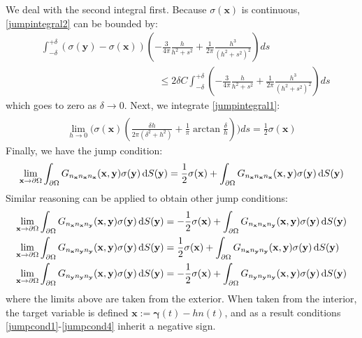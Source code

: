 \documentclass[preprint,12pt,3p]{elsarticle}
\newcommand{\dd}{ {\rm d} }
\begin{document}
We deal with the second integral first. Because $\sigma(\mathbf{x})$ is continuous, \eqref{jumpintegral2} can be bounded by:
\begin{align}
    &\int^{+\delta}_{-\delta} (\sigma(\mathbf{y}) - \sigma(\mathbf{x}))  \left(  - \frac{3}{4 \pi} \frac{h}{h^2 + s^2} + \frac{1}{2\pi} \frac{h^3}{(h^2 + s^2)^2} \right)  ds \nonumber \\
    &\qquad\qquad\qquad\qquad\qquad\qquad \leq 2 \delta C \int^{+\delta}_{-\delta}   \left(  - \frac{3}{4 \pi} \frac{h}{h^2 + s^2} + \frac{1}{2\pi} \frac{h^3}{(h^2 + s^2)^2} \right)  ds
\end{align}
which goes to zero as $\delta \xrightarrow[]{} 0$. Next, we integrate \eqref{jumpintegral1}:
\begin{align}
    \lim_{h \xrightarrow{} 0} \bigg( \sigma(\mathbf{x}) \left( \frac{\delta h}{2\pi(\delta^2 + h^2)}  + \frac{1}{\pi} \arctan \frac{\delta}{h} \right) \bigg) ds = \frac{1}{2} \sigma(\mathbf{x})
\end{align}
Finally, we have the jump condition:
\begin{align}
    \lim_{\mathbf{x} \rightarrow \partial \Omega} \int_{\partial\Omega} G_{n_\mathbf{x}n_\mathbf{x}n_\mathbf{x}}(\mathbf{x},\mathbf{y}) \sigma(\mathbf{y}) \, \dd S(\mathbf{y}) = \frac{1}{2}\sigma(\mathbf{x}) + \int_{\partial\Omega} G_{n_\mathbf{x}n_\mathbf{x}n_\mathbf{x}}(\mathbf{x},\mathbf{y}) \sigma(\mathbf{y}) \, \dd S(\mathbf{y}) \label{jumpcond1}
\end{align}
Similar reasoning can be applied to obtain other jump conditions:
\begin{align}
    \lim_{\mathbf{x} \rightarrow \partial \Omega} \int_{\partial\Omega} G_{n_\mathbf{x}n_\mathbf{x}n_\mathbf{y}}(\mathbf{x},\mathbf{y}) \sigma(\mathbf{y}) \, \dd S(\mathbf{y}) &= -\frac{1}{2}\sigma(\mathbf{x}) + \int_{\partial\Omega} G_{n_\mathbf{x}n_\mathbf{x}n_\mathbf{y}}(\mathbf{x},\mathbf{y}) \sigma(\mathbf{y}) \, \dd S(\mathbf{y}) \\
    \lim_{\mathbf{x} \rightarrow \partial \Omega} \int_{\partial\Omega} G_{n_\mathbf{x}n_\mathbf{y}n_\mathbf{y}}(\mathbf{x},\mathbf{y}) \sigma(\mathbf{y}) \, \dd S(\mathbf{y}) &= \frac{1}{2}\sigma(\mathbf{x}) + \int_{\partial\Omega} G_{n_\mathbf{x}n_\mathbf{y}n_\mathbf{y}}(\mathbf{x},\mathbf{y}) \sigma(\mathbf{y}) \, \dd S(\mathbf{y}) \\
    \lim_{\mathbf{x} \rightarrow \partial \Omega} \int_{\partial\Omega} G_{n_\mathbf{y}n_\mathbf{y}n_\mathbf{y}}(\mathbf{x},\mathbf{y}) \sigma(\mathbf{y}) \, \dd S(\mathbf{y}) &= -\frac{1}{2}\sigma(\mathbf{x}) + \int_{\partial\Omega} G_{n_\mathbf{y}n_\mathbf{y}n_\mathbf{y}}(\mathbf{x},\mathbf{y}) \sigma(\mathbf{y}) \, \dd S(\mathbf{y}) \label{jumpcond4}
\end{align}
where the limits above are taken from the exterior. When taken from the interior, the target variable is defined $\mathbf{x} := \pmb{\gamma}(t) - h n(t)$, and as a result conditions \eqref{jumpcond1}-\eqref{jumpcond4} inherit a negative sign.
\end{document}
